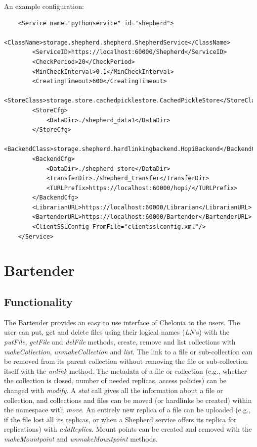 \documentclass{book}
\begin{document}
An example configuration:

\begin{verbatim}
    <Service name="pythonservice" id="shepherd">
        <ClassName>storage.shepherd.shepherd.ShepherdService</ClassName>
        <ServiceID>https://localhost:60000/Shepherd</ServiceID>
        <CheckPeriod>20</CheckPeriod>
        <MinCheckInterval>0.1</MinCheckInterval>
        <CreatingTimeout>600</CreatingTimeout>
        <StoreClass>storage.store.cachedpicklestore.CachedPickleStore</StoreClass>
        <StoreCfg>
            <DataDir>./shepherd_data1</DataDir>
        </StoreCfg>
        <BackendClass>storage.shepherd.hardlinkingbackend.HopiBackend</BackendClass>
        <BackendCfg>
            <DataDir>./shepherd_store</DataDir>
            <TransferDir>./shepherd_transfer</TransferDir>
            <TURLPrefix>https://localhost:60000/hopi/</TURLPrefix>
        </BackendCfg>
        <LibrarianURL>https://localhost:60000/Librarian</LibrarianURL>
        <BartenderURL>https://localhost:60000/Bartender</BartenderURL>
        <ClientSSLConfig FromFile="clientsslconfig.xml"/>
    </Service>    
\end{verbatim}


\newpage

\section{Bartender} %
\label{sec:bartenders}

\subsection{Functionality} %

The Bartender provides an easy to use interface of Chelonia to the users. The user can put, get and delete files using their logical names (\emph{LN}'s) with the \emph{putFile}, \emph{getFile} and \emph{delFile} methods, create, remove and list collections with \emph{makeCollection}, \emph{unmakeCollection} and \emph{list}. The link to a file or sub-collection can be removed from its parent collection without removing the file or sub-collection itself with the \emph{unlink} method. The metadata of a file or collection (e.g., whether the collection is closed, number of needed replicas, access policies) can be changed with \emph{modify}. A \emph{stat} call gives all the information about a file or collection, and collections and files can be moved (or hardlinks be created) within the namespace with \emph{move}. An entirely new replica of a file can be uploaded (e.g., if the file lost all its replicas, or when a Shepherd service offers its replica for replications) with \emph{addReplica}. Mount points can be created and removed with the \emph{makeMountpoint} and \emph{unmakeMountpoint} methods.
\end{document}
